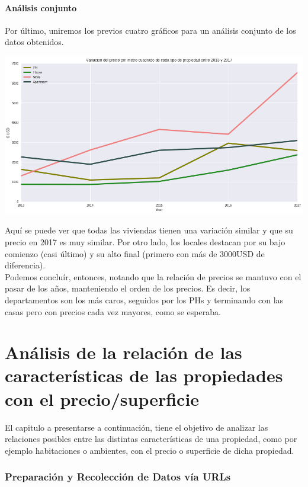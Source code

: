 \documentclass[a4paper, 10pt]{article}
\newcommand\tab[1][0.5cm]{\hspace*{#1}}
\begin{document}
			\subsection{Análisis conjunto}
				Por último, uniremos los previos cuatro gráficos para un análisis conjunto de los datos obtenidos.
				\begin{center}
   		    			\includegraphics[width=\textwidth]{images/jointVariation}
				\end{center}
				\tab Aquí se puede ver que todas las viviendas tienen una variación similar y que su precio en 2017 es muy similar.
				Por otro lado, los locales destacan por su bajo comienzo (casi último) y su alto final (primero con más de $3000$USD
				de diferencia). \\
				\tab Podemos concluír, entonces, notando que la relación de precios se mantuvo con el pasar de los años, manteniendo
				el orden de los precios. Es decir, los departamentos son los más caros, seguidos por los PHs y terminando con
				las casas pero con precios cada vez mayores, como se esperaba.			
			
		\part{Análisis de la relación de las características de las propiedades con el precio/superficie}
	
		El capitulo a presentarse a continuación, tiene el objetivo de analizar las relaciones posibles entre las distintas características de una propiedad, como por ejemplo habitaciones o ambientes, con el precio o superficie de dicha propiedad.
		
		\section{Preparación y Recolección de Datos vía URLs}
		
\end{document}
